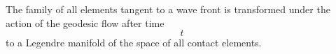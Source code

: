 The family of all elements tangent to a wave front is transformed under the action of the geodesic flow after time $$t$$ to a Legendre manifold of the space of all contact elements.
